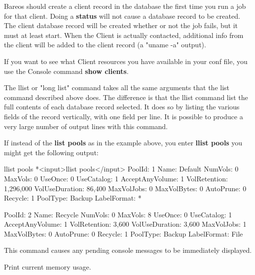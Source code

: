 \begin{description}
   Bareos should create a client record in the database the first time you
   run a job for that client.  Doing a {\bf status} will not cause a
   database record to be created.  The client database record will be
   created whether or not the job fails, but it must at least start.  When
   the Client is actually contacted, additional info from the client will
   be added to the client record (a "uname -a" output).

   If you want to see what Client resources you have available in your conf
   file, you use the Console command {\bf show clients}.

\item [llist]
   The llist or "long list" command takes all the same arguments that the
   list command described above does.  The difference is that the llist
   command list the full contents of each database record selected.  It
   does so by listing the various fields of the record vertically, with one
   field per line.  It is possible to produce a very large number of output
   lines with this command.

   If instead of the {\bf list pools} as in the example above, you enter
   {\bf llist pools} you might get the following output:

\begin{bconsole}{llist pools}
*<input>llist pools</input>
          PoolId: 1
            Name: Default
         NumVols: 0
         MaxVols: 0
         UseOnce: 0
      UseCatalog: 1
 AcceptAnyVolume: 1
    VolRetention: 1,296,000
  VolUseDuration: 86,400
      MaxVolJobs: 0
     MaxVolBytes: 0
       AutoPrune: 0
         Recycle: 1
        PoolType: Backup
     LabelFormat: *

          PoolId: 2
            Name: Recycle
         NumVols: 0
         MaxVols: 8
         UseOnce: 0
      UseCatalog: 1
 AcceptAnyVolume: 1
    VolRetention: 3,600
  VolUseDuration: 3,600
      MaxVolJobs: 1
     MaxVolBytes: 0
       AutoPrune: 0
         Recycle: 1
        PoolType: Backup
     LabelFormat: File
\end{bconsole}

\item [messages]
   This command causes any pending  console messages to be immediately displayed.

\item [memory]
   Print current memory usage.



\end{description}
